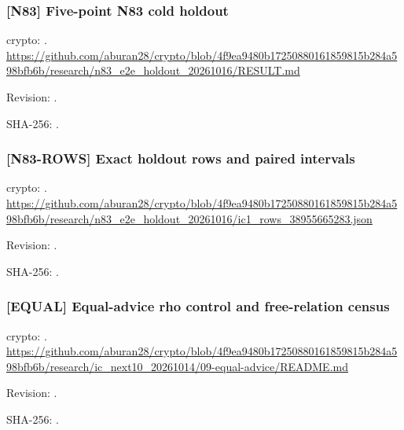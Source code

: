 \par\noindent\begin{minipage}{\linewidth}\small
\subsubsection*{[N83] Five-point N83 cold holdout}\label{art:N83}
crypto: .
\url{https://github.com/aburan28/crypto/blob/4f9ea9480b17250880161859815b284a598bfb6b/research/n83_e2e_holdout_20261016/RESULT.md}
\par Revision: .
\par SHA-256: .
\end{minipage}\par\medskip

\par\noindent\begin{minipage}{\linewidth}\small
\subsubsection*{[N83-ROWS] Exact holdout rows and paired intervals}\label{art:N83-ROWS}
crypto: .
\url{https://github.com/aburan28/crypto/blob/4f9ea9480b17250880161859815b284a598bfb6b/research/n83_e2e_holdout_20261016/ic1_rows_38955665283.json}
\par Revision: .
\par SHA-256: .
\end{minipage}\par\medskip

\par\noindent\begin{minipage}{\linewidth}\small
\subsubsection*{[EQUAL] Equal-advice rho control and free-relation census}\label{art:EQUAL}
crypto: .
\url{https://github.com/aburan28/crypto/blob/4f9ea9480b17250880161859815b284a598bfb6b/research/ic_next10_20261014/09-equal-advice/README.md}
\par Revision: .
\par SHA-256: .
\end{minipage}\par\medskip

